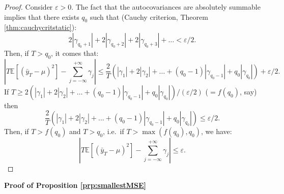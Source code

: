 \documentclass[
  11pt,
]{book}
\theoremstyle{definition}
\theoremstyle{definition}
\theoremstyle{definition}
\theoremstyle{definition}
\theoremstyle{remark}
\begin{document}
\begin{proof}
Consider \(\varepsilon > 0\). The fact that the autocovariances are absolutely summable implies that there exists \(q_0\) such that (Cauchy criterion, Theorem \ref{thm:cauchycritstatic}):
\[
2|\gamma_{q_0+1}|+2|\gamma_{q_0+2}|+2|\gamma_{q_0+3}|+\dots < \varepsilon/2.
\]
Then, if \(T > q_0\), it comes that:
\[
\left|T \mathbb{E}\left[(\bar{y}_T - \mu)^2\right] - \sum_{j=-\infty}^{+\infty} \gamma_j\right|\le \frac{2}{T}\left(|\gamma_1| + 2|\gamma_2| + \dots + (q_0-1)|\gamma_{q_0-1}| +q_0|\gamma_{q_0}|\right) + \varepsilon/2.
\]
If \(T \ge 2\left(|\gamma_1| + 2|\gamma_2| + \dots + (q_0-1)|\gamma_{q_0-1}| +q_0|\gamma_{q_0}|\right)/(\varepsilon/2)\) (\(= f(q_0)\), say) then
\[
\frac{2}{T}\left(|\gamma_1| + 2|\gamma_2| + \dots + (q_0-1)|\gamma_{q_0-1}| +q_0|\gamma_{q_0}|\right) \le \varepsilon/2.
\]
Then, if \(T>f(q_0)\) and \(T>q_0\), i.e.~if \(T>\max(f(q_0),q_0)\), we have:
\[
\left|T \mathbb{E}\left[(\bar{y}_T - \mu)^2\right] - \sum_{j=-\infty}^{+\infty} \gamma_j\right|\le \varepsilon.
\]
\end{proof}

\textbf{Proof of Proposition \ref{prp:smallestMSE}}
\end{document}
